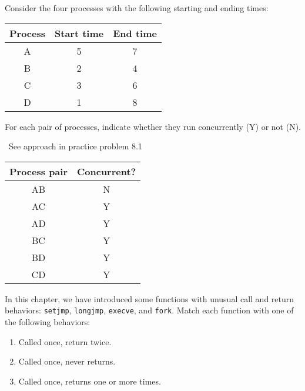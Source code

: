 \documentclass[12pt]{article}
\newenvironment{ex}[2][Exercise]{\begin{trivlist}
		\item[\hskip \labelsep {\bfseries #1}\hskip \labelsep {\bfseries #2.}]}{\end{trivlist}}
\newenvironment{sol}[1][Solution]{\begin{trivlist}
		\item[\hskip \labelsep {\bfseries #1:}]}{\end{trivlist}}
\begin{document}
\begin{ex}{8.9}
	Consider the four processes with the following starting and ending times:
	\begin{center}
		\begin{tabular}{ccc}
			Process & Start time & End time\\
			\hline
			A & 5 & 7\\
			B & 2 & 4\\
			C & 3 & 6\\
			D & 1 & 8
		\end{tabular}
	\end{center}
	For each pair of processes, indicate whether they run concurrently (Y) or not (N).
\end{ex}

\begin{sol}
	\
	See approach in practice problem 8.1
	\begin{center}
		\begin{tabular}{cc}
			Process pair & Concurrent?\\
			\hline
			AB & N\\
			AC & Y\\
			AD & Y\\
			BC & Y\\
			BD & Y\\
			CD & Y
		\end{tabular}
	\end{center}
\end{sol}

\begin{ex}{8.10}
	In this chapter, we have introduced some functions with unusual call and return behaviors:
	\texttt{setjmp}, \texttt{longjmp}, \texttt{execve}, and \texttt{fork}. Match each function with one
	of the following behaviors:
	\begin{enumerate}[label=(\alph*)]
		\item Called once, return twice.
		\item Called once, never returns.
		\item Called once, returns one or more times.
	\end{enumerate}
\end{ex}
\end{document}
